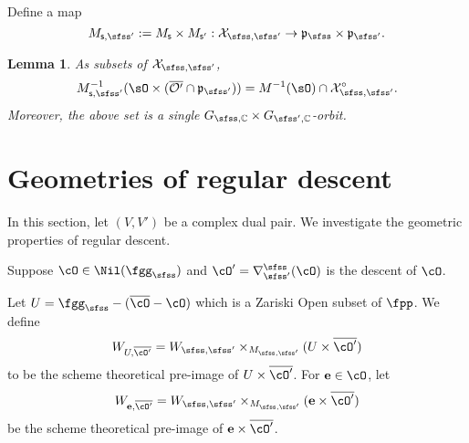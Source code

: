 \documentclass[12pt,a4paper]{amsart}
\newcommand{\CO}{{\mathcal {O}}}
\newcommand{\CX}{{\mathcal {X}}}
\newcommand{\p}{\mathfrak p}
\newcommand{\X}{\mathbf{X}}
\def\DD{\nabla}
\numberwithin{equation}{section}
\newtheorem{lem}[thm]{Lemma}
\theoremstyle{remark}
\def\UU{\rU}
\def\X{{\mathbf{e}}}
\def\bcOp{\overline{\cO'}}
\begin{document}
Define a map
\[
   M_{\mathsf s, \sfss'}:= M_{\mathsf s}\times M_{\mathsf s'}: \CX_{\sfss, \sfss'}\rightarrow \p_\sfss\times \p_{\sfss'}.
\]


\begin{lem}
As subsets of $\CX_{\sfss, \sfss'}$, 
\[
    M_{\mathsf s, \sfss'}^{-1}(\sO\times (\overline{\CO'}\cap \p_{\sfss'})) = M^{-1}(\sO)\cap \CX_{\sfss, \sfss'}^\circ.
    \]
Moreover, the above set is a single $G_{\sfss, \C}\times G_{\sfss',\C}$-orbit. 
\end{lem}


\section{Geometries of regular descent}

\def\UU{U}
\def\dbM{\breve{M}}
\def\dbMM{\breve{MM}}
\def\dbX{\breve{X}}
\def\dbfpp{\breve{\fpp}}
\def\ZdbX{\cZ_{\dbX}}
\def\aV{\acute{V}}
\def\fggs{\fgg_{\sfss}}
\def\fggsp{\fgg_{\sfss'}}
\def\fggspo{\fgg_{\sfss'_1}}
\def\fggspt{\fgg_{\sfss'_2}}
\def\fggspi{\fgg_{\sfss'_i}}
\def\fkks{\fkk_{\sfss}}
\def\fkksp{\fkk_{\sfss'}}
\def\fkkspo{\fkk_{\sfss'_1}}
\def\fkkspt{\fkk_{\sfss'_2}}
\def\fkkspi{\fkk_{\sfss'_i}}
\def\fpps{\fpp_{\sfss}}
\def\fppsp{\fpp_{\sfss'}}
\def\fppspo{\fpp_{\sfss'_1}}
\def\fppspt{\fpp_{\sfss'_2}}
\def\fppspi{\fpp_{\sfss'_i}}
\def\DDss{\DD_{\sfss'}^{\sfss}}
\def\DDsso{\DD_{\sfss'_1}^{\sfss}}
\def\Mss{M_{\sfss,\sfss'}}
\def\Ms{M_{\sfss}}
\def\Msp{M_{\sfss'}}

\def\Gs{{G}_{\sfss}}
\def\Gsp{{G}_{\sfss'}}
\def\Gspo{{G}_{\sfss'_1}}
\def\Gspt{{G}_{\sfss'_2}}
\def\CMs{{\tilde M}_{\sfss}}
\def\CMsp{{\tilde M}_{\sfss'}}
\def\CMss{{\tilde M}_{\sfss,\sfss'}}
\def\Wss{{W_{\sfss,\sfss'}}}
\def\Woss{{W^{\circ}_{\sfss,\sfss'}}}
\def\CXss{\cX_{\sfss,\sfss'}}
\def\Xp{{\bfee'}}
\def\Xpo{{\bfee'_1}}
\def\ww{\phi}
\def\wwo{\phi_1}

\def\Vs{V_\sfss}
\def\Vsp{V_{\sfss'}}
\def\Vspo{V_{\sfss'_1}}
\def\Vspt{V_{\sfss'_2}}
\def\Vspi{V_{\sfss'_i}}
\def\Wssi{W_{\sfss,\sfss'_i}}
\def\Wsso{W_{\sfss,\sfss'_1}}
\def\Wsst{W_{\sfss,\sfss'_2}}

In this section, let $(V,V')$ be a complex dual
pair. %
We investigate the geometric properties of regular descent.

Suppose $\cO\in \Nil(\fggs)$ and $\cO' = \DDss(\cO)$ is
the descent of $\cO$.



Let $\UU = \fggs - (\overline{\cO} - \cO)$ which is a Zariski Open subset of $\fpp$.
We define
\[
W_{\UU,\bcOp} = \Wss \times_{\Mss} (\UU\times \bcOp)
\]
to be the scheme theoretical pre-image of $\UU\times \bcOp$.
For $\X \in \cO$, let
\[
  W_{\X,\bcOp} = \Wss\times_{\Mss} (\X\times \bcOp)
\]
be the scheme theoretical pre-image of  $\X\times \bcOp$.
\end{document}
